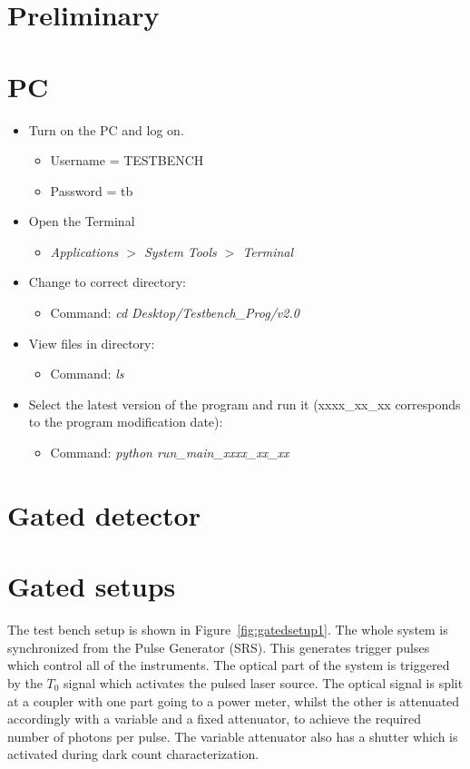 \documentclass{article}
\begin{document}
\section*{Preliminary}
\section{PC}

\begin{itemize}
\item
Turn on the PC and log on. 
\begin{itemize}
\item
Username = TESTBENCH
\item
Password = tb
\end{itemize}

\item
Open the {Terminal}
\begin{itemize}
\item 
\emph{Applications $>$ System Tools $>$ Terminal}
\end{itemize}

\item
Change to correct directory:
\begin{itemize}
\item
Command: \emph{cd Desktop/Testbench\_Prog/v2.0}
\end{itemize}

\item
View files in directory:
\begin{itemize}
\item
Command: \emph{ls}
\end{itemize}

\item
Select the latest version of the program and run it (xxxx\_xx\_xx corresponds to the program modification date):
\begin{itemize}
\item
Command: \emph{python run\_main\_xxxx\_xx\_xx}
\end{itemize}

\end{itemize}


\section{Gated detector}
\section*{Gated setups}\label{Sec:gated}
The test bench setup is shown in Figure~\ref{fig:gatedsetup1}. The whole system is synchronized from the Pulse Generator (SRS). This generates trigger pulses which control all of the instruments. The optical part of the system is triggered by the $T_{0}$ signal which activates the pulsed laser source. The optical signal is split at a coupler with one part going to a power meter, whilst the other is attenuated accordingly with a variable and a fixed attenuator, to achieve the required number of photons per pulse. The variable attenuator also has a shutter which is activated during dark count characterization.
\end{document}
